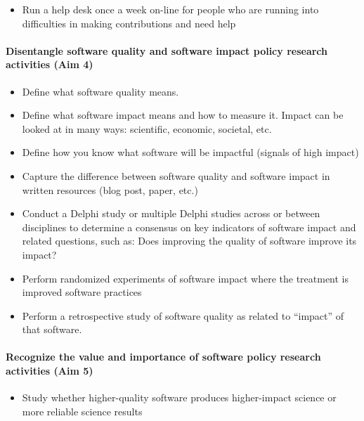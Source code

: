\documentclass[
]{book}
\providecommand{\tightlist}{%
  \setlength{\itemsep}{0pt}\setlength{\parskip}{0pt}}
\begin{document}
\begin{itemize}
\tightlist
\item
  Run a help desk once a week on-line for people who are running into difficulties in making contributions and need help
\end{itemize}

\hypertarget{disentangle-software-quality-and-software-impact-policy-research-activities-aim-4}{%
\paragraph{Disentangle software quality and software impact policy research activities (Aim 4)}\label{disentangle-software-quality-and-software-impact-policy-research-activities-aim-4}}

\begin{itemize}
\item
  Define what software quality means.
\item
  Define what software impact means and how to measure it. Impact can be looked at in many
  ways: scientific, economic, societal, etc.
\item
  Define how you know what software will be impactful (signals of high impact)
\item
  Capture the difference between software quality and software impact in written resources (blog post, paper, etc.)
\item
  Conduct a Delphi study or multiple Delphi studies across or between disciplines to determine
  a consensus on key indicators of software impact and related questions, such as: Does improving
  the quality of software improve its impact?
\item
  Perform randomized experiments of software impact where the treatment is improved software practices
\item
  Perform a retrospective study of software quality as related to ``impact'' of that software.
\end{itemize}

\hypertarget{recognize-the-value-and-importance-of-software-policy-research-activities-aim-5}{%
\paragraph{Recognize the value and importance of software policy research activities (Aim 5)}\label{recognize-the-value-and-importance-of-software-policy-research-activities-aim-5}}

\begin{itemize}
\tightlist
\item
  Study whether higher-quality software produces higher-impact science or more reliable science results
\end{itemize}
\end{document}
